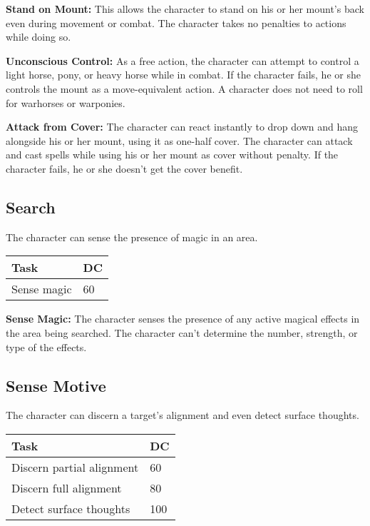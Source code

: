 \documentclass{article}
\begin{document}
\textbf{Stand on Mount: }This allows the character to stand on his or her mount's 
back even during movement or combat. The character takes no penalties to actions 
while doing so. 

\textbf{Unconscious Control: }As a free action, the character can attempt to control 
a light horse, pony, or heavy horse while in combat. If the character fails, he 
or she controls the mount as a move-equivalent action. A character does not need 
to roll for warhorses or warponies. 

\textbf{Attack from Cover: }The character can react instantly to drop down and 
hang alongside his or her mount, using it as one-half cover. The character can 
attack and cast spells while using his or her mount as cover without penalty. If 
the character fails, he or she doesn't get the cover benefit. 

\vspace{12pt}
\subsection*{Search }

The character can sense the presence of magic in an area. 

\begin{tabular}{|>{\raggedright}p{49pt}|>{\raggedright}p{13pt}|}
\hline
T\textbf{ask } & D\textbf{C }\tabularnewline
\hline
Sense magic  & 60 \tabularnewline
\hline
\end{tabular}

\textbf{Sense Magic: }The character senses the presence of any active magical effects 
in the area being searched. The character can't determine the number, strength, 
or type of the effects. 

\vspace{12pt}
\subsection*{Sense Motive }

The character can discern a target's alignment and even detect surface thoughts.

\begin{tabular}{|>{\raggedright}p{100pt}|>{\raggedright}p{13pt}|}
\hline
T\textbf{ask } & D\textbf{C}\tabularnewline
\hline
Discern partial alignment  & 60 \tabularnewline
\hline
Discern full alignment  & 80 \tabularnewline
\hline
Detect surface thoughts  & 100 \tabularnewline
\hline
\end{tabular}
\end{document}
